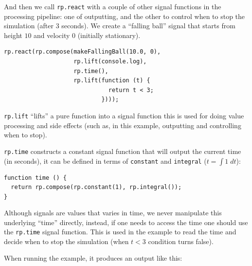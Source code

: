 \documentclass[notitlepage]{article}
\begin{document}
And then we call \texttt{rp.react} with a couple of other signal functions in
the processing pipeline: one of outputting, and the other to control when to
stop the simulation (after 3 seconds). We create a ``falling ball'' signal that
starts from height $10$ and velocity $0$ (initially stationary).

\begin{lstlisting}
rp.react(rp.compose(makeFallingBall(10.0, 0),
                    rp.lift(console.log),
                    rp.time(),
                    rp.lift(function (t) {
                              return t < 3;
                            })));
\end{lstlisting}

\texttt{rp.lift} ``lifts'' a pure function into a signal function \- this is
used for doing value processing and side effects (such as, in this example,
outputting and controlling when to stop).

\texttt{rp.time} constructs a constant signal function that will output the
current time (in seconds), it can be defined in terms of \texttt{constant}
and \texttt{integral} ($t = \int 1 \; dt$):

\begin{lstlisting}
function time () {
  return rp.compose(rp.constant(1), rp.integral());
}
\end{lstlisting}

Although signals are values that varies in time, we never manipulate this
underlying ``time'' directly, instead, if one needs to access the time one
should use the \texttt{rp.time} signal function. This is used in the example to
read the time and decide when to stop the simulation (when $t < 3$ condition
turns false).

When running the example, it produces an output like this:
\end{document}
